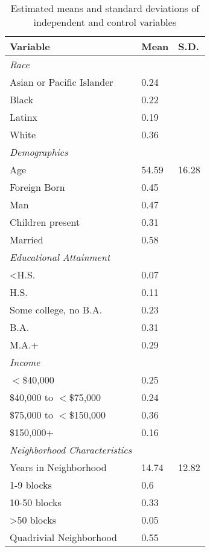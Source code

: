 \begin{table}[ht]
\centering
\caption{Estimated means and standard deviations of independent and control variables} 
\begin{tabular}{lp{.5in}p{.5in}}
  \toprule
Variable & Mean & S.D. \\ 
  \midrule
\emph{Race}&&\\Asian or Pacific Islander & 0.24 &  \\ 
  Black & 0.22 &  \\ 
  Latinx & 0.19 &  \\ 
  White & 0.36 &  \\ 
  \emph{Demographics}&&\\Age & 54.59 & 16.28 \\ 
  Foreign Born & 0.45 &  \\ 
  Man & 0.47 &  \\ 
  Children present & 0.31 &  \\ 
  Married & 0.58 &  \\ 
  \emph{Educational Attainment}&&\\<H.S. & 0.07 &  \\ 
  H.S. & 0.11 &  \\ 
  Some college, no B.A. & 0.23 &  \\ 
  B.A. & 0.31 &  \\ 
  M.A.+ & 0.29 &  \\ 
  \emph{Income}&&\\$<$\$40,000 & 0.25 &  \\ 
  \$40,000 to $<$\$75,000 & 0.24 &  \\ 
  \$75,000 to $<$\$150,000 & 0.36 &  \\ 
  \$150,000+ & 0.16 &  \\ 
  \emph{Neighborhood Characteristics}\\Years in Neighborhood & 14.74 & 12.82 \\ 
  1-9 blocks & 0.6 &  \\ 
  10-50 blocks & 0.33 &  \\ 
  >50 blocks & 0.05 &  \\ 
  Quadrivial Neighborhood & 0.55 &  \\ 
   \bottomrule
\end{tabular}
\end{table}
